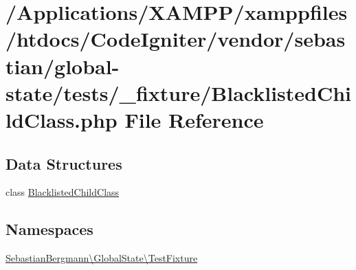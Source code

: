 \hypertarget{_blacklisted_child_class_8php}{}\section{/\+Applications/\+X\+A\+M\+P\+P/xamppfiles/htdocs/\+Code\+Igniter/vendor/sebastian/global-\/state/tests/\+\_\+fixture/\+Blacklisted\+Child\+Class.php File Reference}
\label{_blacklisted_child_class_8php}
\subsection*{Data Structures}
\begin{DoxyCompactItemize}
\item 
class \mbox{\hyperlink{class_sebastian_bergmann_1_1_global_state_1_1_test_fixture_1_1_blacklisted_child_class}{Blacklisted\+Child\+Class}}
\end{DoxyCompactItemize}
\subsection*{Namespaces}
\begin{DoxyCompactItemize}
\item 
 \mbox{\hyperlink{namespace_sebastian_bergmann_1_1_global_state_1_1_test_fixture}{Sebastian\+Bergmann\textbackslash{}\+Global\+State\textbackslash{}\+Test\+Fixture}}
\end{DoxyCompactItemize}
